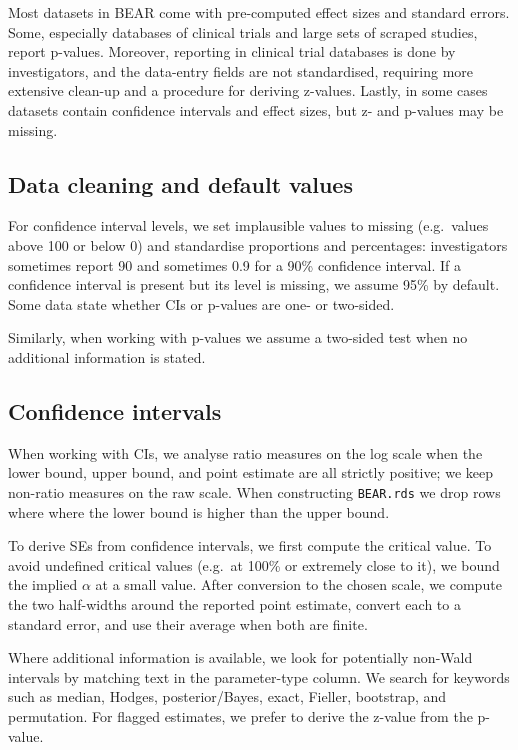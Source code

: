 \documentclass[
  11pt,
]{article}
\begin{document}
Most datasets in BEAR come with pre-computed effect sizes and standard
errors. Some, especially databases of clinical trials and large sets of
scraped studies, report p-values. Moreover, reporting in clinical trial
databases is done by investigators, and the data-entry fields are not
standardised, requiring more extensive clean-up and a procedure for
deriving z-values. Lastly, in some cases datasets contain confidence
intervals and effect sizes, but z- and p-values may be missing.

\subsection{Data cleaning and default
values}\label{data-cleaning-and-default-values}

For confidence interval levels, we set implausible values to missing
(e.g.~values above 100 or below 0) and standardise proportions and
percentages: investigators sometimes report 90 and sometimes 0.9 for a
90\% confidence interval. If a confidence interval is present but its
level is missing, we assume 95\% by default. Some data state whether CIs
or p-values are one- or two-sided.

Similarly, when working with p-values we assume a two-sided test when no
additional information is stated.

\subsection{Confidence intervals}\label{confidence-intervals}

When working with CIs, we analyse ratio measures on the log scale when
the lower bound, upper bound, and point estimate are all strictly
positive; we keep non-ratio measures on the raw scale. When constructing
\texttt{BEAR.rds} we drop rows where where the lower bound is higher
than the upper bound.

To derive SEs from confidence intervals, we first compute the critical
value. To avoid undefined critical values (e.g.~at 100\% or extremely
close to it), we bound the implied \(\alpha\) at a small value. After
conversion to the chosen scale, we compute the two half-widths around
the reported point estimate, convert each to a standard error, and use
their average when both are finite.

Where additional information is available, we look for potentially
non-Wald intervals by matching text in the parameter-type column. We
search for keywords such as median, Hodges, posterior/Bayes, exact,
Fieller, bootstrap, and permutation. For flagged estimates, we prefer to
derive the z-value from the p-value.
\end{document}
